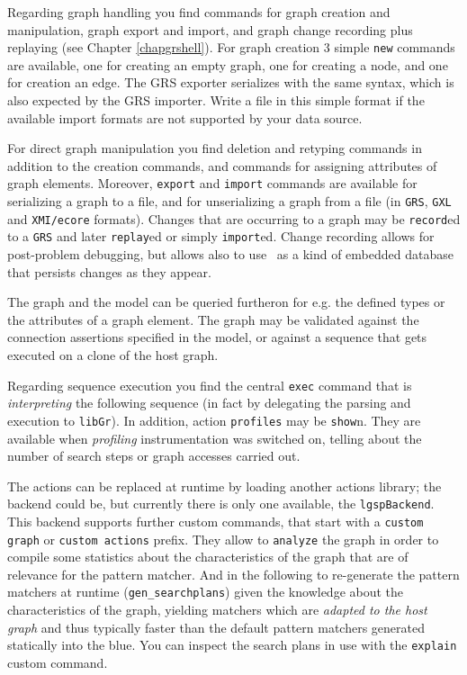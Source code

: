 Regarding graph handling you find commands for graph creation and manipulation, graph export and import, and graph change recording plus replaying (see Chapter \ref{chapgrshell}).
For graph creation 3 simple \texttt{new} commands are available, one for creating an empty graph, one for creating a node, and one for creation an edge.
The GRS exporter serializes with the same syntax, which is also expected by the GRS importer.
Write a file in this simple format if the available import formats are not supported by your data source.

For direct graph manipulation you find deletion and retyping commands in addition to the creation commands, and commands for assigning attributes of graph elements.
Moreover, \texttt{export} and \texttt{import} commands are available for serializing a graph to a file, and for unserializing a graph from a file (in \texttt{GRS}, \texttt{GXL} and \texttt{XMI/ecore} formats). 
Changes that are occurring to a graph may be \texttt{record}ed to a \texttt{GRS} and later \texttt{replay}ed or simply \texttt{import}ed.
Change recording allows for post-problem debugging, but allows also to use \GrG\ as a kind of embedded database that persists changes as they appear. %

The graph and the model can be queried furtheron for e.g. the defined types or the attributes of a graph element.
The graph may be validated against the connection assertions specified in the model, or against a sequence that gets executed on a clone of the host graph.

Regarding sequence execution you find the central \texttt{exec} command that is \emph{interpreting} the following sequence (in fact by delegating the parsing and execution to \texttt{libGr}).
In addition, action \texttt{profiles} may be \texttt{show}n. They are available when \emph{profiling} instrumentation was switched on, telling about the number of search steps or graph accesses carried out.

The actions can be replaced at runtime by loading another actions library; the backend could be, but currently there is only one available, the \texttt{lgspBackend}.
This backend supports further custom commands, that start with a \texttt{custom graph} or \texttt{custom actions} prefix. 
They allow to \texttt{analyze} the graph in order to compile some statistics about the characteristics of the graph that are of relevance for the pattern matcher.
And in the following to re-generate the pattern matchers at runtime (\texttt{gen\_searchplans}) given the knowledge about the characteristics of the graph, yielding matchers which are \emph{adapted to the host graph} and thus typically faster than the default pattern matchers generated statically into the blue.
You can inspect the search plans in use with the \texttt{explain} custom command.


